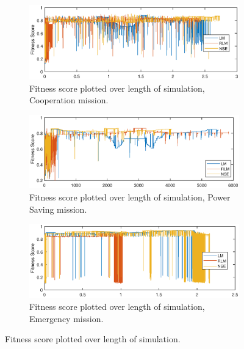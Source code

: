 \begin{figure}[ht]
\begin{center}
\begin{subfigure}{\linewidth}
\centering
\includegraphics[width=\linewidth]{figures/matlab_sim_results/fitObserved_coop.eps}
\caption{Fitness score plotted over length of simulation, Cooperation mission.}\label{res:matSimFitscore_coop}
\end{subfigure}
\end{center}

\begin{center}
\begin{subfigure}{\linewidth}		
\centering
\includegraphics[width=\linewidth]{figures/matlab_sim_results/fitObserved_powerSave.eps}
\caption{Fitness score plotted over length of simulation, Power Saving mission.}\label{res:matSimFitscore_power}
\end{subfigure}
\end{center}

\begin{center}
\begin{subfigure}{\linewidth}
	\centering
	\includegraphics[width=\linewidth]{figures/matlab_sim_results/fitObserved_emer.eps}
\caption{Fitness score plotted over length of simulation, Emergency mission.}\label{res:matSimFitscore_emer}
\end{subfigure}
\end{center}
\caption{Fitness score plotted over length of simulation.}\label{res:matSimFitscore}
\end{figure}

